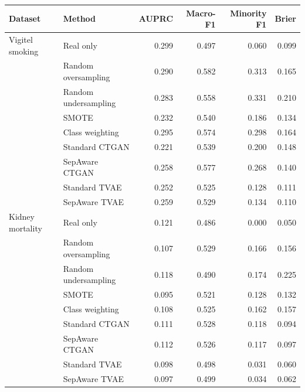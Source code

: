 \begin{tabular}{llrrrr}
\toprule
Dataset & Method & AUPRC & Macro-F1 & Minority F1 & Brier \\
\midrule
Vigitel smoking & Real only & 0.299 & 0.497 & 0.060 & 0.099 \\
 & Random oversampling & 0.290 & 0.582 & 0.313 & 0.165 \\
 & Random undersampling & 0.283 & 0.558 & 0.331 & 0.210 \\
 & SMOTE & 0.232 & 0.540 & 0.186 & 0.134 \\
 & Class weighting & 0.295 & 0.574 & 0.298 & 0.164 \\
 & Standard CTGAN & 0.221 & 0.539 & 0.200 & 0.148 \\
 & SepAware CTGAN & 0.258 & 0.577 & 0.268 & 0.140 \\
 & Standard TVAE & 0.252 & 0.525 & 0.128 & 0.111 \\
 & SepAware TVAE & 0.259 & 0.529 & 0.134 & 0.110 \\
\midrule
Kidney mortality & Real only & 0.121 & 0.486 & 0.000 & 0.050 \\
 & Random oversampling & 0.107 & 0.529 & 0.166 & 0.156 \\
 & Random undersampling & 0.118 & 0.490 & 0.174 & 0.225 \\
 & SMOTE & 0.095 & 0.521 & 0.128 & 0.132 \\
 & Class weighting & 0.108 & 0.525 & 0.162 & 0.157 \\
 & Standard CTGAN & 0.111 & 0.528 & 0.118 & 0.094 \\
 & SepAware CTGAN & 0.112 & 0.526 & 0.117 & 0.097 \\
 & Standard TVAE & 0.098 & 0.498 & 0.031 & 0.060 \\
 & SepAware TVAE & 0.097 & 0.499 & 0.034 & 0.062 \\
\bottomrule
\end{tabular}
